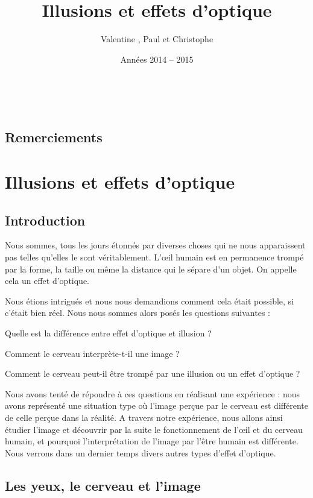 \documentclass[a4paper, 12pt, onecolumn, openany]{report}
\title{\bsc{Thème : La Mesure} \\ \Huge{Illusions et effets d'optique}}
\author{Valentine \bsc{Sénégas}, Paul \bsc{Souchon} et Christophe \bsc{Néraud}}
\date{Années 2014 -- 2015}
\begin{document}
\renewcommand{\chaptername}{Partie}
\maketitle

\newpage
~
\newpage

\chapter*{Remerciements}
\pagestyle{fancy}

\renewcommand{\contentsname}{Sommaire} %
\tableofcontents

\part*{Illusions et effets d'optique}
\chapter*{Introduction}
	Nous sommes, tous les jours étonnés par diverses choses qui ne nous apparaissent pas telles qu’elles le sont véritablement. L’œil humain est en permanence trompé par la forme, la taille ou même la distance qui le sépare d’un objet. On appelle cela un effet d’optique.  
	
	Nous étions intrigués et nous nous demandions comment cela était possible, si c’était bien réel. Nous nous sommes alors posés les questions suivantes :
	
	Quelle est la différence entre effet d'optique et illusion ?

	Comment le cerveau interprète-t-il une image ? 
	
	Comment le cerveau peut-il être trompé par une illusion ou un effet d'optique ?
	
	Nous avons tenté de répondre à ces questions en réalisant une expérience : nous avons représenté une situation type où l’image perçue par le cerveau est différente de celle perçue dans la réalité. A travers notre expérience, nous allons ainsi étudier l’image et découvrir par la suite le fonctionnement de l’œil et du cerveau humain, et pourquoi l’interprétation de l’image par l’être humain est différente. Nous verrons dans un dernier temps divers autres types d’effet d’optique.
	
\chapter{Les yeux, le cerveau et l'image}
\end{document}
